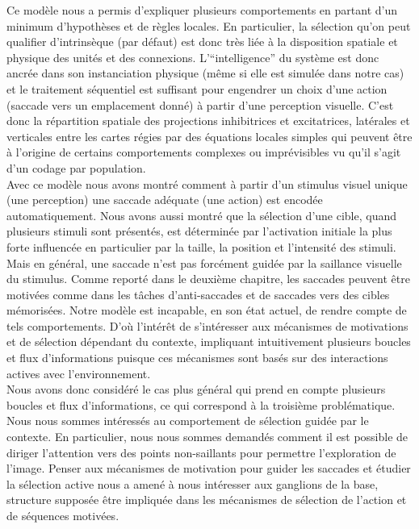 Ce modèle nous a permis d'expliquer plusieurs comportements en partant d'un minimum d'hypothèses et de règles locales. En particulier, la sélection qu'on peut qualifier d'intrinsèque (par défaut) est donc très liée à la disposition spatiale et physique des unités et des connexions. L'``intelligence'' du système est donc ancrée dans son instanciation physique (même si elle est simulée dans notre cas) et le traitement séquentiel est suffisant pour engendrer un choix d'une action (saccade vers un emplacement donné) à partir d'une perception visuelle. C'est donc la répartition spatiale des projections inhibitrices et excitatrices, latérales et verticales entre les cartes régies par des équations locales simples qui peuvent être à l'origine de certains comportements complexes ou imprévisibles vu qu'il s'agit d'un codage par population. \\%

Avec ce modèle nous avons montré comment à partir d'un stimulus visuel unique (une perception) une saccade adéquate (une action) est encodée automatiquement. Nous avons aussi montré que la sélection d'une cible, quand plusieurs stimuli sont présentés, est déterminée par l'activation initiale la plus forte influencée en particulier par la taille, la position et l'intensité des stimuli. Mais en général, une saccade n'est pas forcément guidée par la saillance visuelle du stimulus. Comme reporté dans le deuxième chapitre, les saccades peuvent être motivées comme dans les tâches d'anti-saccades et de saccades vers des cibles mémorisées. Notre modèle est incapable, en son état actuel, de rendre compte de tels comportements. D'o\`u l'intérêt de s'intéresser aux mécanismes de motivations et de sélection dépendant du contexte, impliquant intuitivement plusieurs boucles et flux d'informations puisque ces mécanismes sont basés sur des interactions actives avec l'environnement. \\%

Nous avons donc considéré le cas plus général qui prend en compte plusieurs boucles et flux d'informations, ce qui correspond à la troisième problématique. Nous nous sommes intéressés au comportement de sélection guidée par le contexte. En particulier, nous nous sommes demandés comment il est possible de diriger l'attention vers des points non-saillants pour permettre l'exploration de l'image. Penser aux mécanismes de motivation pour guider les saccades et étudier la sélection active nous a amené à nous intéresser aux ganglions de la base, structure supposée être impliquée dans les mécanismes de sélection de l'action et de séquences motivées.\\%


